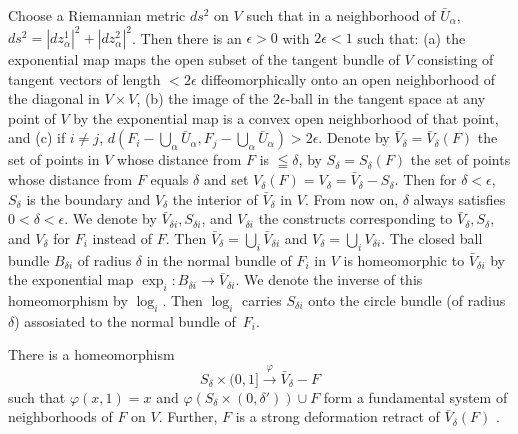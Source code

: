 Choose a Riemannian metric $ds^2$ on $V$ such that in a neighborhood of $\bar{U}_\alpha$, $ds^2 = |dz^1_\alpha|^2 + |dz^2_\alpha|^2$. Then there is an $\epsilon > 0$ with $2 \epsilon < 1$ such that: (a) the exponential map maps the open subset of the tangent bundle of $V$ consisting  of tangent vectors of length $< 2 \epsilon$ diffeomorphically onto an open neighborhood of the diagonal in $V \times V$, (b) the image of the $2 \epsilon$-ball in the tangent space at any point of $V$ by the exponential map is a convex open neighborhood of that point, and (c) if $i \neq j$, $d (F_i - \bigcup_\alpha \bar{U}_\alpha, F_j - \bigcup_\alpha \bar{U}_\alpha) > 2 \epsilon$. Denote by $\bar{V}_\delta = \bar{V}_\delta (F)$ the set of points in $V$ whose distance from $F$ is $\leqq \delta$, by $S_\delta = S_\delta (F)$ the set of points whose distance from $F$ equals $\delta$ and set $V_\delta (F) = V_\delta =\bar{V}_\delta - S_\delta$. Then for $\delta < \epsilon$, $S_\delta$ is the boundary and $V_\delta$ the interior of $\bar{V}_\delta$ in $V$. From now on, $\delta$ always satisfies $0 < \delta < \epsilon$. We denote by $\bar{V}_{\delta i}, S_{\delta i}$, and $V_{\delta i}$ the constructs corresponding to $\bar{V}_\delta, S_\delta$, and $V_\delta$ for $F_i$ instead of $F$. Then $\bar{V}_\delta = \bigcup_i \bar{V}_{\delta i}$ and $V_\delta = \bigcup_i V_{\delta i}$. The closed ball bundle $B_{\delta i}$ of radius $\delta$ in the normal bundle of $F_i$ in $V$ is homeomorphic to $\bar{V}_{\delta i}$ by the exponential map  $\exp_i : B_{\delta i} \to \bar{V}_{\delta i}$. We denote the inverse of this homeomorphism by $\log_i$. Then $\log_i$ carries $S_{\delta i}$ onto the circle bundle (of radius $\delta$) assosiated to the normal bundle of~$F_i$.

\begin{lem}\label{art8-lem1}%
There is a homeomorphism
$$
S_\delta \times (0,1] \xrightarrow{\varphi} \bar{V}_{\delta} - F 
$$
such that $\varphi (x,1) = x$ and $\varphi (S_\delta \times (0,\delta')) \cup F$ form a fundamental system of neighborhoods of $F$ on $V$. Further, $F$ is a strong deformation retract of $\bar{V}_\delta (F)$ .
\end{lem}

